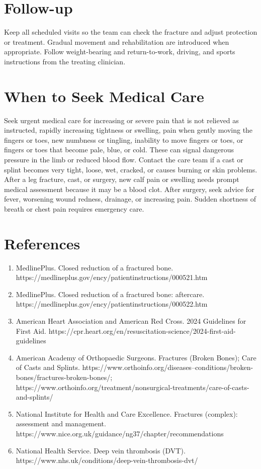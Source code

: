 \section*{Follow-up}
Keep all scheduled visits so the team can check the fracture and adjust protection or treatment. Gradual movement and rehabilitation are introduced when appropriate. Follow weight-bearing and return-to-work, driving, and sports instructions from the treating clinician.

\section*{When to Seek Medical Care}
Seek urgent medical care for increasing or severe pain that is not relieved as instructed, rapidly increasing tightness or swelling, pain when gently moving the fingers or toes, new numbness or tingling, inability to move fingers or toes, or fingers or toes that become pale, blue, or cold. These can signal dangerous pressure in the limb or reduced blood flow. Contact the care team if a cast or splint becomes very tight, loose, wet, cracked, or causes burning or skin problems. After a leg fracture, cast, or surgery, new calf pain or swelling needs prompt medical assessment because it may be a blood clot. After surgery, seek advice for fever, worsening wound redness, drainage, or increasing pain. Sudden shortness of breath or chest pain requires emergency care.

\section*{References}
\begin{enumerate}
  \item MedlinePlus. Closed reduction of a fractured bone. https://medlineplus.gov/ency/patientinstructions/000521.htm
  \item MedlinePlus. Closed reduction of a fractured bone: aftercare. https://medlineplus.gov/ency/patientinstructions/000522.htm
  \item American Heart Association and American Red Cross. 2024 Guidelines for First Aid. https://cpr.heart.org/en/resuscitation-science/2024-first-aid-guidelines
  \item American Academy of Orthopaedic Surgeons. Fractures (Broken Bones); Care of Casts and Splints. https://www.orthoinfo.org/diseases--conditions/broken-bones/fractures-broken-bones/; https://www.orthoinfo.org/treatment/nonsurgical-treatments/care-of-casts-and-splints/
  \item National Institute for Health and Care Excellence. Fractures (complex): assessment and management. https://www.nice.org.uk/guidance/ng37/chapter/recommendations
  \item National Health Service. Deep vein thrombosis (DVT). https://www.nhs.uk/conditions/deep-vein-thrombosis-dvt/
\end{enumerate}

\clearpage
